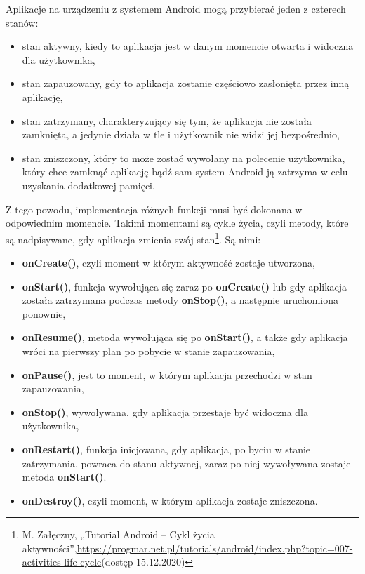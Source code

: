 \documentclass[twoside]{projektInzynierskiMS}
\numberwithin{figure}{section}
\begin{document}
Aplikacje na urządzeniu z systemem Android mogą przybierać jeden z czterech stanów:
\begin{itemize}
    \item stan aktywny, kiedy to aplikacja jest w danym momencie otwarta i widoczna dla użytkownika,
    \item stan zapauzowany, gdy to aplikacja zostanie częściowo zasłonięta przez inną aplikację,
    \item stan zatrzymany, charakteryzujący się tym, że aplikacja nie została zamknięta, a jedynie działa w tle i użytkownik nie widzi jej bezpośrednio,
    \item stan zniszczony, który to może zostać wywołany na polecenie użytkownika, który chce zamknąć aplikację bądź sam system Android ją zatrzyma w celu uzyskania dodatkowej pamięci.
\end{itemize}
Z tego powodu, implementacja różnych funkcji musi być dokonana w odpowiednim momencie. Takimi momentami są cykle życia, czyli metody, które są nadpisywane, gdy aplikacja zmienia swój stan\footnote{M. Załęczny, „Tutorial Android -- Cykl życia aktywności”,\newline \url{https://progmar.net.pl/tutorials/android/index.php?topic=007-activities-life-cycle}\newline (dostęp 15.12.2020)}. Są nimi:
\begin{itemize}
    \item \textbf{onCreate()}, czyli moment w którym aktywność zostaje utworzona,
    \item \textbf{onStart()}, funkcja wywołująca się zaraz po \textbf{onCreate()} lub gdy aplikacja została zatrzymana podczas metody \textbf{onStop()}, a następnie uruchomiona ponownie,
    \item \textbf{onResume()}, metoda wywołująca się po \textbf{onStart()}, a także gdy aplikacja wróci na pierwszy plan po pobycie w stanie zapauzowania,
    \item \textbf{onPause()}, jest to moment, w którym aplikacja przechodzi w stan zapauzowania,
    \item \textbf{onStop()}, wywoływana, gdy aplikacja przestaje być widoczna dla użytkownika,
    \item \textbf{onRestart()}, funkcja inicjowana, gdy aplikacja, po byciu w stanie zatrzymania, powraca do stanu aktywnej, zaraz po niej wywoływana zostaje metoda \textbf{onStart()}.
    \item \textbf{onDestroy()}, czyli moment, w którym aplikacja zostaje zniszczona.
\end{itemize}
\end{document}
